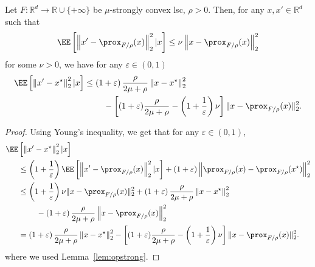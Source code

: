 \begin{lemma}
    \label{lem:basereco}
    Let $F: \mathbb{R}^d \to \mathbb{R}\cup\{+\infty\}$ be $\mu$-strongly convex lsc, $\rho>0$. Then, for any $x,x' \in\mathbb{R}^d$ such that 
    \begin{align*}
      \EE \left[  \left\|x' - \prox_{F/{\rho }}(x) \right\|^2_2 | x \right] \leq  \nu  \left\|x - \prox_{F/{\rho }}(x) \right\|^2_2 
    \end{align*}
    for some $\nu>0$, we have for any $\varepsilon\in(0,1)$
    \begin{align}
       \label{eq:basestrong} 
        \EE \left[   \left\|x' - x^\star  \right\|^2_2 | x \right] &\leq \left( 1 + \varepsilon \right)  \frac{{\rho }}{2\mu + {\rho }}  \left\|x - x^\star \right\|^2_2 \\
   \nonumber     &\hspace*{0.8cm} -\left[ (1 + \varepsilon) \frac{{\rho }}{2\mu + {\rho }}  - \left( 1 + \frac{1}{\varepsilon} \right)  \nu  \right]  \|x -  \prox_{F/{\rho }}(x)   \|^2_2.
     \end{align}
\end{lemma}


\begin{proof}
     Using Young's inequality, we get that for any $\varepsilon\in(0,1)$,
\begin{align*}
    \EE & \left[ \left\|x' - x^\star  \right\|^2_2  | x \right] \\
    &\leq \left( 1 + \frac{1}{\varepsilon} \right)  \EE \left[ \left\|x' -  \prox_{F/{\rho }}(x)   \right\|^2_2  | x \right]   +   \left( 1 + \varepsilon \right)\left\| \prox_{F/{\rho }}(x) - \prox_{F/{\rho }}(x^\star ) \right\|^2_2 \\
    &\leq \left( 1 + \frac{1}{\varepsilon} \right)  \nu  \|x -  \prox_{F/{\rho }}(x)   \|^2_2 +   \left( 1 + \varepsilon \right)  \frac{{\rho }}{2\mu + {\rho }} \left\|x - x^\star \right\|^2_2 \\
    &\hspace*{0.8cm} -  \left( 1 + \varepsilon \right)  \frac{{\rho }}{2\mu + {\rho }}  \left\| x - \prox_{F/{\rho }}(x)  \right\|^2_2 \\
     &= \left( 1 + \varepsilon \right)  \frac{{\rho }}{2\mu + {\rho }}  \left\|x - x^\star \right\|^2_2  -\left[ (1 + \varepsilon) \frac{{\rho }}{2\mu + {\rho }}  - \left( 1 + \frac{1}{\varepsilon} \right)  \nu  \right]  \|x -  \prox_{F/{\rho }}(x)   \|^2_2.
 \end{align*}
where we used Lemma~\ref{lem:opstrong}.
\end{proof}
